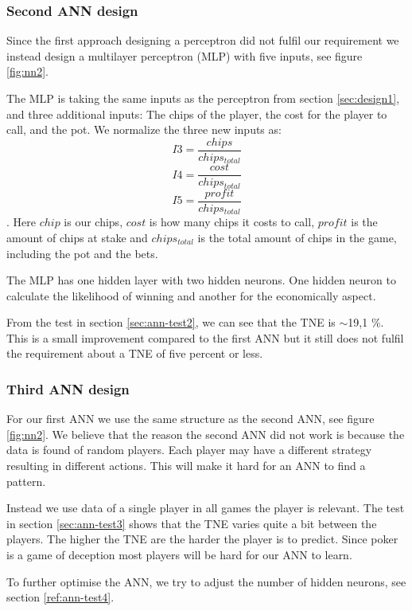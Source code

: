 \subsubsection{Second ANN design}
\label{sec:design2}
Since the first approach designing a perceptron did not fulfil our requirement we instead design a multilayer perceptron (MLP) with five inputs, see figure \ref{fig:nn2}.

The MLP is taking the same inputs as the perceptron from section \ref{sec:design1}, and three additional inputs: The chips of the player, the cost for the player to call, and the pot. We normalize the three new inputs as: \[I3 = \frac{chips}{chips_{total}}\] \[I4 = \frac{cost}{chips_{total}}\] \[I5 = \frac{profit}{chips_{total}}\]. 
Here $chip$ is our chips, $cost$ is how many chips it costs to call, $profit$ is the amount of chips at stake and $chips_{total}$ is the total amount of chips in the game, including the pot and the bets.

The MLP has one hidden layer with two hidden neurons. One hidden neuron to calculate the likelihood of winning and another for the economically aspect.



From the test in section \ref{sec:ann-test2}, we can see that the TNE is $\sim$19,1 \%. This is a small improvement compared to the first ANN but it still does not fulfil the requirement about a TNE of five percent or less. 

\subsubsection{Third ANN design}
\label{sec:design3}
For our first ANN we use the same structure as the second ANN, see figure \ref{fig:nn2}. We believe that the reason the second ANN did not work is because the data is found of random players. Each player may have a different strategy resulting in different actions. This will make it hard for an ANN to find a pattern. 

Instead we use data of a single player in all games the player is relevant. The test in section \ref{sec:ann-test3} shows that the TNE varies quite a bit between the players. The higher the TNE are the harder the player is to predict. Since poker is a game of deception most players will be hard for our ANN to learn.

To further optimise the ANN, we try to adjust the number of hidden neurons, see section \ref{ref:ann-test4}.

